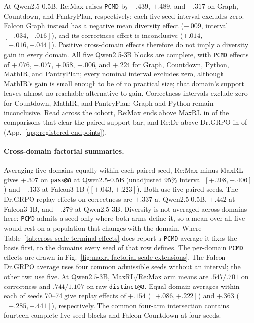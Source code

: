 \documentclass{article}
\newcommand{\1}{\mathbf 1}
\newcommand{\pmd}{\texttt{PCMD}}
\theoremstyle{remark}
\theoremstyle{definition}
\theoremstyle{plain}
\begin{document}
At Qwen2.5-0.5B, Re:Max raises \pmd{} by $+.439$, $+.489$, and $+.317$ on
Graph, Countdown, and PantryPlan, respectively; each five-seed interval excludes
zero. Falcon Graph instead has a negative mean diversity effect ($-.009$, interval
$[-.034,+.016]$), and its correctness effect is inconclusive ($+.014$,
$[-.016,+.044]$). Positive cross-domain effects therefore do not imply a diversity
gain in every domain. All five Qwen2.5-3B blocks are complete, with \pmd{}
effects of $+.076$, $+.077$, $+.058$, $+.006$, and $+.224$ for Graph, Countdown,
Python, MathIR, and PantryPlan; every nominal interval excludes zero, although
MathIR's gain is small enough to be of no practical size; that domain's
support leaves almost no reachable alternative to gain. Correctness intervals
exclude zero for Countdown, MathIR, and PantryPlan; Graph and Python remain
inconclusive. Read across the cohort, Re:Max ends above MaxRL in
\PMDaboveReMax{} of the \PMDblocksReMax{} comparisons that clear the paired
support bar, and Re:Dr above Dr.GRPO in \PMDaboveReDr{} of
\PMDblocksReDr{} (App.~\ref{app:registered-endpoints}).

\paragraph{Cross-domain factorial summaries.}
\label{app:factorial-numerical-detail}
Averaging five domains equally within each paired seed, Re:Max minus MaxRL
gives $+.307$ on \texttt{pass@8} at Qwen2.5-0.5B (unadjusted 95\% interval
$[+.208,+.406]$) and $+.133$ at Falcon3-1B ($[+.043,+.223]$). Both use five
paired seeds. The Dr.GRPO replay effects on correctness are $+.337$ at
Qwen2.5-0.5B, $+.442$ at Falcon3-1B, and $+.279$ at Qwen2.5-3B. Diversity is not averaged across domains here: \pmd{} admits a seed only where
both arms define it, so a mean over all five would rest on a population that
changes with the domain. Where
Table~\ref{tab:cross-scale-terminal-effects} does report a \pmd{} average it
fixes the basis first, to the domains every seed of that row defines. The
per-domain \pmd{} effects are drawn in
Fig.~\ref{fig:maxrl-factorial-scale-extensions}. The Falcon Dr.GRPO average uses four common admissible seeds
without an interval; the other two use five. At Qwen2.5-3B, MaxRL/Re:Max arm
means are $.547/.701$ on correctness and $.744/1.107$ on raw
\texttt{distinct@8}. Equal domain averages within each of seeds 70--74 give
replay effects of $+.154$ ($[+.086,+.222]$) and $+.363$ ($[+.285,+.441]$),
respectively. The common four-arm intersection contains fourteen complete
five-seed blocks and Falcon Countdown at four seeds.
\end{document}
